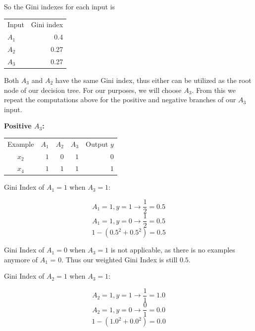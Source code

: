 \documentclass{article}
\begin{document}
\noindent So the Gini indexes for each input is 

\begin{center}
    \begin{tabular}{l r}
        Input & Gini index \\
        $A_1$ & 0.4 \\
        $A_2$ & 0.27 \\
        $A_3$ & 0.27
    \end{tabular}
\end{center}

Both $A_3$ and $A_2$ have the same Gini index, thus either can be utilized as the root node of our decision tree. For our purposes, we will choose $A_3$. From this we repeat the computations above for the positive and negative branches of our $A_3$ input.

\noindent \textbf{Positive $A_3$:}

\begin{center}
    \begin{tabular}{ c r r r r }
        Example & $A_1$ & $A_2$ & $A_3$ & Output $y$\\ 
        $x_2$ & $1$ & $0$ & $1$ & $0$\\
        $x_4$ & $1$ & $1$ & $1$ & $1$\\
    \end{tabular}
\end{center}

\noindent Gini Index of $A_1=1$ when $A_3=1$:

\begin{equation}
    {A_1=1,y=1} \rightarrow \frac{1}{2} = 0.5
\end{equation}
\begin{equation}
    {A_1=1,y=0} \rightarrow \frac{1}{2} = 0.5
\end{equation}
\begin{equation}
    1 - (0.5^2 + 0.5^2) = 0.5
\end{equation}

\noindent Gini Index of $A_1=0$ when $A_3=1$ is not applicable, as there is no examples anymore of $A_1$ = 0. Thus our weighted Gini Index is still $0.5$.

\noindent Gini Index of $A_2=1$ when $A_3=1$:

\begin{equation}
    {A_2=1,y=1} \rightarrow \frac{1}{1} = 1.0
\end{equation}
\begin{equation}
    {A_2=1,y=0} \rightarrow \frac{0}{1} = 0.0
\end{equation}
\begin{equation}
    1 - (1.0^2 + 0.0^2) = 0.0
\end{equation}
\end{document}
